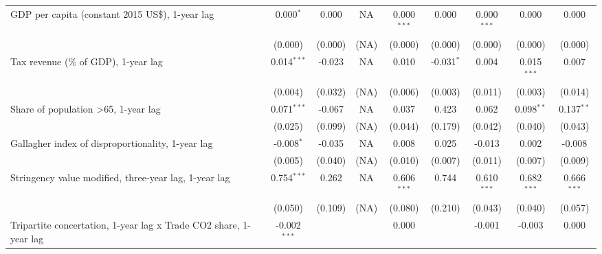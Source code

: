\begin{table}[htbp]
\begin{tabular}{lcccccccc}
      GDP per capita (constant 2015 US\$), 1-year lag                   & 0.000$^{*}$    & 0.000                     & NA           & 0.000$^{***}$  & 0.000            & 0.000$^{***}$   & 0.000           & 0.000\\   
                                                                        & (0.000)        & (0.000)                   & (NA)         & (0.000)        & (0.000)          & (0.000)         & (0.000)         & (0.000)\\   
      Tax revenue (\% of GDP), 1-year lag                               & 0.014$^{***}$  & -0.023                    & NA           & 0.010          & -0.031$^{*}$     & 0.004           & 0.015$^{***}$   & 0.007\\   
                                                                        & (0.004)        & (0.032)                   & (NA)         & (0.006)        & (0.003)          & (0.011)         & (0.003)         & (0.014)\\   
      Share of population >65, 1-year lag                               & 0.071$^{***}$  & -0.067                    & NA           & 0.037          & 0.423            & 0.062           & 0.098$^{**}$    & 0.137$^{**}$\\   
                                                                        & (0.025)        & (0.099)                   & (NA)         & (0.044)        & (0.179)          & (0.042)         & (0.040)         & (0.043)\\   
      Gallagher index of disproportionality, 1-year lag                 & -0.008$^{*}$   & -0.035                    & NA           & 0.008          & 0.025            & -0.013          & 0.002           & -0.008\\   
                                                                        & (0.005)        & (0.040)                   & (NA)         & (0.010)        & (0.007)          & (0.011)         & (0.007)         & (0.009)\\   
      Stringency value modified, three-year lag, 1-year lag             & 0.754$^{***}$  & 0.262                     & NA           & 0.606$^{***}$  & 0.744            & 0.610$^{***}$   & 0.682$^{***}$   & 0.666$^{***}$\\   
                                                                        & (0.050)        & (0.109)                   & (NA)         & (0.080)        & (0.210)          & (0.043)         & (0.040)         & (0.057)\\   
      Tripartite concertation, 1-year lag x Trade CO2 share, 1-year lag & -0.002$^{***}$ &                           &              & 0.000          &                  & -0.001          & -0.003          & 0.000\\   

\end{tabular}
\end{table}
